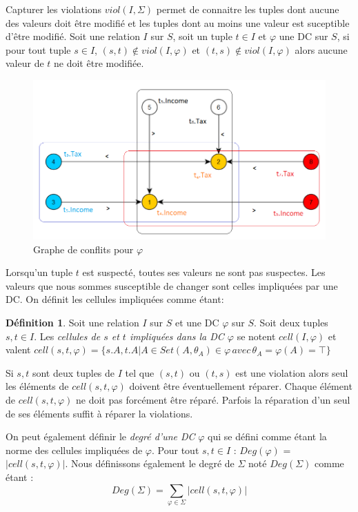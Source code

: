 \documentclass[letterpaper, 12pt]{report}
\theoremstyle{definition}
\newtheorem{mydef}{Définition}
\begin{document}
Capturer les violations $viol(I,\Sigma)$ permet de connaitre les tuples dont aucune des valeurs doit être modifié et les tuples dont au moins une valeur est suceptible d'être modifié. Soit une relation $I$ sur $S$, soit un tuple $t \in I$ et $\varphi$ une DC sur $S$, si pour tout tuple $s \in I$, $(s,t) \not \in viol(I,\varphi)$ et $(t,s) \not \in viol(I,\varphi)$ alors aucune valeur de $t$ ne doit être modifiée.\\

\begin{figure}
 \centering
 \includegraphics[scale=0.7]{img/grapht4.png}
 \caption{\label{grapht4} Graphe de conflits pour $\varphi$}
\end{figure}

Lorsqu'un tuple $t$ est suspecté, toutes ses valeurs ne sont pas suspectes. Les valeurs que nous sommes susceptible de changer sont celles impliquées par une DC. On définit les cellules impliquées comme étant:

\begin{mydef}
Soit une relation $I$ sur $S$ et une DC $\varphi$ sur $S$. Soit deux tuples $s,t \in I$. Les \emph{cellules de $s$ et $t$ impliquées dans la DC $\varphi$ } se notent $cell(I,\varphi)$ et valent $cell(s,t,\varphi) = \{s.A,t.A| A \in S et (A,\theta_A) \in \varphi\, avec\, \theta_A = \varphi(A) = \top \}$
\end{mydef}

Si $s,t$ sont deux tuples de $I$ tel que $(s,t)$ ou $(t,s)$ est une violation alors seul les éléments de $cell(s,t,\varphi)$ doivent être éventuellement réparer. Chaque élément de $cell(s,t,\varphi)$ ne doit pas forcément être réparé. Parfois la réparation d'un seul de ses éléments suffit à réparer la violations.

On peut également définir le \emph{degré d'une DC} $\varphi$ qui se défini comme étant la norme des cellules impliquées de $\varphi$. Pour tout $s,t \in I$ : $Deg(\varphi)$ = $ |cell(s,t,\varphi)|$. Nous définissons également le degré de $\Sigma$ noté $Deg(\Sigma)$ comme étant : $$Deg(\Sigma) = \sum_{\varphi \in \Sigma} |cell(s,t,\varphi)|$$
\end{document}
